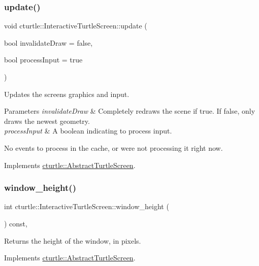 \subsubsection{\texorpdfstring{update()}{update()}}
{\footnotesize\ttfamily void cturtle\+::\+Interactive\+Turtle\+Screen\+::update (\begin{DoxyParamCaption}\item[{bool}]{invalidate\+Draw = {\ttfamily false},  }\item[{bool}]{process\+Input = {\ttfamily true} }\end{DoxyParamCaption})\hspace{0.3cm}{\ttfamily [virtual]}}

Updates the screen\textquotesingle{}s graphics and input. 
\begin{DoxyParams}{Parameters}
{\em invalidate\+Draw} & Completely redraws the scene if true. If false, only draws the newest geometry. \\
\hline
{\em process\+Input} & A boolean indicating to process input. \\
\hline
\end{DoxyParams}
No events to process in the cache, or we\textquotesingle{}re not processing it right now. 

Implements \hyperlink{classcturtle_1_1AbstractTurtleScreen}{cturtle\+::\+Abstract\+Turtle\+Screen}.

\mbox{\label{classcturtle_1_1InteractiveTurtleScreen_a259883332b284e3b8a97b5bfb74f988d}} 
\subsubsection{\texorpdfstring{window\+\_\+height()}{window\_height()}}
{\footnotesize\ttfamily int cturtle\+::\+Interactive\+Turtle\+Screen\+::window\+\_\+height (\begin{DoxyParamCaption}{ }\end{DoxyParamCaption}) const\hspace{0.3cm}{\ttfamily [inline]}, {\ttfamily [virtual]}}

Returns the height of the window, in pixels. 

Implements \hyperlink{classcturtle_1_1AbstractTurtleScreen}{cturtle\+::\+Abstract\+Turtle\+Screen}.

